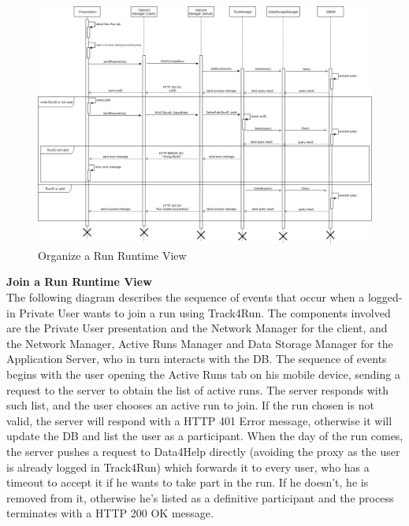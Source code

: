 \documentclass[titlepage]{article}
\begin{document}
\begin{figure}[H]
	\center
  	\includegraphics[width=15cm]{Organize.png}
  	\caption{Organize a Run Runtime View}
 	\label{fig:ORG}
\end{figure}


{\bf Join a Run Runtime View }\\ 
The following diagram describes the sequence of events that occur when a logged-in Private User wants to join a run using Track4Run.
The components involved are the Private User presentation and the Network Manager for the client, and the Network Manager, Active Runs Manager and Data Storage Manager for the Application Server, who in turn interacts with the DB.
The sequence of events begins with the user opening the Active Runs tab on his mobile device, sending a request to the server to obtain the list of active runs. The server responds with such list, and the user chooses an active run to join. If the run chosen is not valid, the server will respond with a HTTP 401 Error message, otherwise it will update the DB and list the user as a participant.
When the day of the run comes, the server pushes a request to Data4Help directly (avoiding the proxy as the user is already logged in Track4Run) which forwards it to every user, who has a timeout to accept it if he wants to take part in the run. If he doesn’t, he is removed from it, otherwise he’s listed as a definitive participant and the process terminates with a HTTP 200 OK message.
\end{document}
